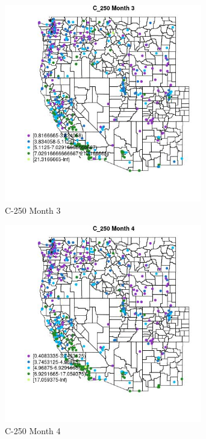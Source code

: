 \begin{figure} 
\centering  
\includegraphics[width=0.77\textwidth]{Code_Outputs/ML_input_report_ML_input_PM25_Step5_part_d_de_duplicated_aves_ML_input_MapObsMo3C_250.jpg} 
\caption{\label{fig:ML_input_report_ML_input_PM25_Step5_part_d_de_duplicated_aves_ML_inputMapObsMo3C_250}C-250 Month 3} 
\end{figure} 
 

\begin{figure} 
\centering  
\includegraphics[width=0.77\textwidth]{Code_Outputs/ML_input_report_ML_input_PM25_Step5_part_d_de_duplicated_aves_ML_input_MapObsMo4C_250.jpg} 
\caption{\label{fig:ML_input_report_ML_input_PM25_Step5_part_d_de_duplicated_aves_ML_inputMapObsMo4C_250}C-250 Month 4} 
\end{figure} 
 

